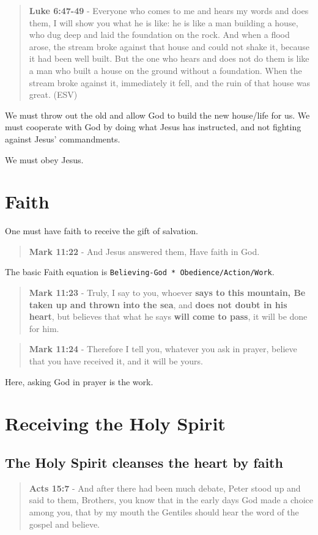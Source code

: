 \documentclass[11pt]{article}
\begin{document}
\begin{quote}
\textbf{Luke 6:47-49} - Everyone who comes to me and hears my words and does them, I will show you what he is like: he is like a man building a house, who dug deep and laid the foundation on the rock. And when a flood arose, the stream broke against that house and could not shake it, because it had been well built. But the one who hears and does not do them is like a man who built a house on the ground without a foundation. When the stream broke against it, immediately it fell, and the ruin of that house was great. (ESV)
\end{quote}

We must throw out the old and allow God to build the new house/life for us.
We must cooperate with God by doing what Jesus has instructed, and not fighting against Jesus' commandments.

We must obey Jesus.

\section{Faith}
\label{sec:orga8908cf}
One must have faith to receive the gift of salvation.

\begin{quote}
\textbf{Mark 11:22} - And Jesus answered them, Have faith in God.
\end{quote}

The basic Faith equation is \texttt{Believing-God * Obedience/Action/Work}.

\begin{quote}
\textbf{Mark 11:23} - Truly, I say to you, whoever \textbf{says to this mountain, Be taken up and thrown into the sea}, and \textbf{does not doubt in his heart}, but believes that what he says \textbf{will come to pass}, it will be done for him.
\end{quote}

\begin{quote}
\textbf{Mark 11:24} - Therefore I tell you, whatever you ask in prayer, believe that you have received it, and it will be yours.
\end{quote}

Here, asking God in prayer is the work.

\section{Receiving the Holy Spirit}
\label{sec:org0d5d844}
\subsection{The Holy Spirit cleanses the heart by faith}
\label{sec:org3e894cc}
\begin{quote}
\textbf{Acts 15:7} - And after there had been much debate, Peter stood up and said to them, Brothers, you know that in the early days God made a choice among you, that by my mouth the Gentiles should hear the word of the gospel and believe.
\end{quote}
\end{document}
